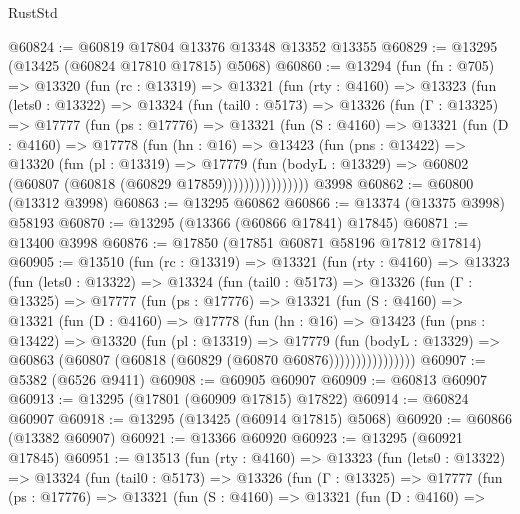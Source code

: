 \begin{lexlean}{RustStd}
\begin{coremodule}
@60824 := @60819 @17804 @13376 @13348 @13352 @13355
@60829 := @13295 (@13425 (@60824 @17810 @17815) @5068)
@60860 := @13294
    (fun (fn : @705) =>
    @13320
      (fun (rc : @13319) =>
      @13321
        (fun (rty : @4160) =>
        @13323
          (fun (lets0 : @13322) =>
          @13324
            (fun (tail0 : @5173) =>
            @13326
              (fun (Γ : @13325) =>
              @17777
                (fun (ps : @17776) =>
                @13321
                  (fun (S : @4160) =>
                  @13321
                    (fun (D : @4160) =>
                    @17778
                      (fun (hn : @16) =>
                      @13423
                        (fun (pns : @13422) =>
                        @13320
                          (fun (pl : @13319) =>
                          @17779
                            (fun (bodyL : @13329) =>
                            @60802 (@60807 (@60818 (@60829 @17859))))))))))))))))
    @3998
@60862 := @60800 (@13312 @3998)
@60863 := @13295 @60862
@60866 := @13374 (@13375 @3998) @58193
@60870 := @13295 (@13366 (@60866 @17841) @17845)
@60871 := @13400 @3998
@60876 := @17850 (@17851 @60871 @58196 @17812 @17814)
@60905 := @13510
    (fun (rc : @13319) =>
    @13321
      (fun (rty : @4160) =>
      @13323
        (fun (lets0 : @13322) =>
        @13324
          (fun (tail0 : @5173) =>
          @13326
            (fun (Γ : @13325) =>
            @17777
              (fun (ps : @17776) =>
              @13321
                (fun (S : @4160) =>
                @13321
                  (fun (D : @4160) =>
                  @17778
                    (fun (hn : @16) =>
                    @13423
                      (fun (pns : @13422) =>
                      @13320
                        (fun (pl : @13319) =>
                        @17779
                          (fun (bodyL : @13329) =>
                          @60863 (@60807 (@60818 (@60829 (@60870 @60876))))))))))))))))
@60907 := @5382 (@6526 @9411)
@60908 := @60905 @60907
@60909 := @60813 @60907
@60913 := @13295 (@17801 (@60909 @17815) @17822)
@60914 := @60824 @60907
@60918 := @13295 (@13425 (@60914 @17815) @5068)
@60920 := @60866 (@13382 @60907)
@60921 := @13366 @60920
@60923 := @13295 (@60921 @17845)
@60951 := @13513
    (fun (rty : @4160) =>
    @13323
      (fun (lets0 : @13322) =>
      @13324
        (fun (tail0 : @5173) =>
        @13326
          (fun (Γ : @13325) =>
          @17777
            (fun (ps : @17776) =>
            @13321
              (fun (S : @4160) =>
              @13321
                (fun (D : @4160) =>

\end{coremodule}
\end{lexlean}
